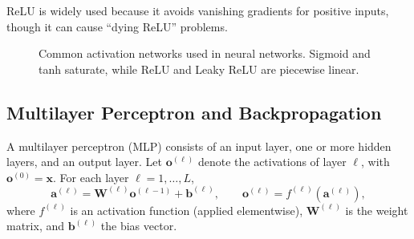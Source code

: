 \documentclass{tufte-handout}
\begin{document}
ReLU is widely used because it avoids vanishing gradients for positive inputs, though it can cause “dying ReLU” problems.

\begin{figure}[h]
\centering
{}
\caption{Common activation networks used in neural networks. Sigmoid and tanh saturate, while ReLU and Leaky ReLU are piecewise linear.}
\label{fig:activations}
\end{figure}

\subsection{Multilayer Perceptron and Backpropagation}

A multilayer perceptron (MLP) consists of an input layer, one or more hidden layers, and an output layer. Let $\mathbf{o}^{(\ell)}$ 
denote the activations of layer $\ell$, with $\mathbf{o}^{(0)} = \mathbf{x}$. For each layer $\ell=1,\dots,L$,
\[
\mathbf{a}^{(\ell)} = \mathbf{W}^{(\ell)}\mathbf{o}^{(\ell-1)} + \mathbf{b}^{(\ell)},\qquad 
\mathbf{o}^{(\ell)} = f^{(\ell)}(\mathbf{a}^{(\ell)}),
\]
where $f^{(\ell)}$ is an activation function (applied elementwise), $\mathbf{W}^{(\ell)}$ is the weight matrix, and $\mathbf{b}^{(\ell)}$ the bias vector.
\end{document}
